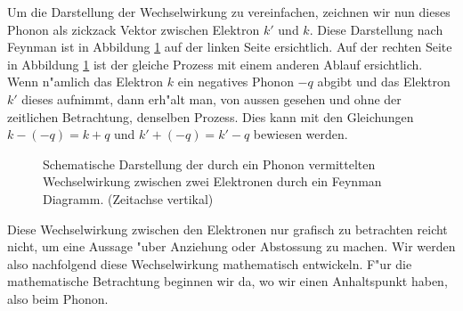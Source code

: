 \begin{refsection}
Um die Darstellung der Wechselwirkung zu vereinfachen, zeichnen wir nun dieses Phonon
als zickzack Vektor zwischen Elektron $k'$ und $k$. Diese Darstellung nach Feynman
ist in Abbildung \ref{supraleitung:FeynmanDiagram1} auf der linken Seite ersichtlich.
Auf der rechten Seite in Abbildung \ref{supraleitung:FeynmanDiagram1} ist der gleiche Prozess mit
einem anderen Ablauf ersichtlich. Wenn n"amlich das Elektron $k$ ein negatives Phonon $-q$ abgibt
und das Elektron $k'$ dieses aufnimmt, dann erh"alt man, von aussen gesehen und ohne der zeitlichen
Betrachtung, denselben Prozess. Dies kann mit den Gleichungen $k-(-q) = k + q$
und $k' +(-q) = k' - q$ bewiesen werden.

\begin{figure} %
\centering

\caption{Schematische Darstellung der durch ein Phonon vermittelten
Wechselwirkung zwischen zwei Elektronen durch ein Feynman Diagramm.
(Zeitachse vertikal)
\label{supraleitung:FeynmanDiagram1}}
\end{figure}

Diese Wechselwirkung zwischen den Elektronen nur grafisch zu betrachten reicht nicht,
um eine Aussage "uber Anziehung oder Abstossung zu machen.
Wir werden also nachfolgend diese Wechselwirkung mathematisch entwickeln.
F"ur die mathematische Betrachtung beginnen wir da, wo wir einen Anhaltspunkt haben, also beim Phonon.


\end{refsection}
